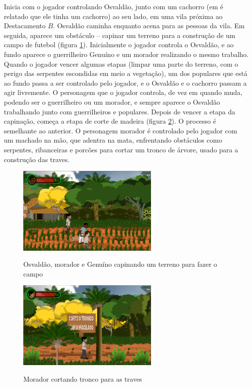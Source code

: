Inicia com o jogador controlando Osvaldão, junto com um cachorro (em  é relatado que ele tinha um cachorro) ao seu lado, em uma vila próxima ao Destacamento $B$. Osvaldão caminha enquanto acena para as pessoas da vila. Em seguida, aparece um obstáculo -- capinar um terreno para a construção de um campo de futebol (figura \ref{fig:osvaldo_capinando}). Inicialmente o jogador controla o Osvaldão, e ao fundo aparece o guerrilheiro Genuíno e um morador realizando o mesmo trabalho. Quando o jogador vencer algumas etapas (limpar uma parte do terreno, com o perigo das serpentes escondidas em meio a vegetação), um dos populares que está ao fundo passa a ser controlado pelo jogador, e o Osvaldão e o cachorro passam a agir livremente. O personagem que o jogador controla, de vez em quando muda, podendo ser o guerrilheiro ou um morador, e sempre aparece o Osvaldão trabalhando junto com guerrilheiros e populares. Depois de vencer a etapa da capinação, começa a etapa de corte de madeira (figura \ref{fig:morador_tronco}). O processo é semelhante ao anterior. O personagem morador é controlado pelo jogador com um machado na mão, que adentra na mata, enfrentando obstáculos como serpentes, ribanceiras e porcões para cortar um tronco de árvore, usado para a construção das traves.

\begin{figure}[H]
	\centering
	\caption{Osvaldão, morador e Genuíno capinando um terreno para fazer o campo}
	\includegraphics[width=0.62\textwidth]{figuras/osvaldo_capinando.png}
	\label{fig:osvaldo_capinando}
	{}
\end{figure}

\begin{figure}[H]
	\centering
	\caption{Morador cortando tronco para as traves}
	\includegraphics[width=0.62\textwidth]{figuras/morador_tronco.png}
	\label{fig:morador_tronco}
	{}
\end{figure}

